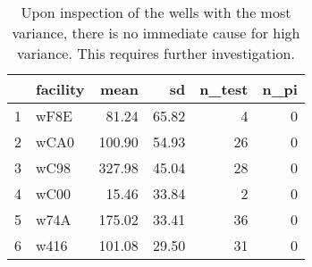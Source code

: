 \begin{table}[h]
\centering
\begin{tabular}{rlrrrr}
  \hline
 & facility & mean & sd & n\_test & n\_pi \\ 
  \hline
1 & wF8E & 81.24 & 65.82 &   4 &   0 \\ 
  2 & wCA0 & 100.90 & 54.93 &  26 &   0 \\ 
  3 & wC98 & 327.98 & 45.04 &  28 &   0 \\ 
  4 & wC00 & 15.46 & 33.84 &   2 &   0 \\ 
  5 & w74A & 175.02 & 33.41 &  36 &   0 \\ 
  6 & w416 & 101.08 & 29.50 &  31 &   0 \\ 
   \hline
\end{tabular}
\caption{Upon inspection of the wells with the most variance, there is no immediate cause for high variance. This requires further investigation.} 
\label{tab:well_summaries}
\end{table}
